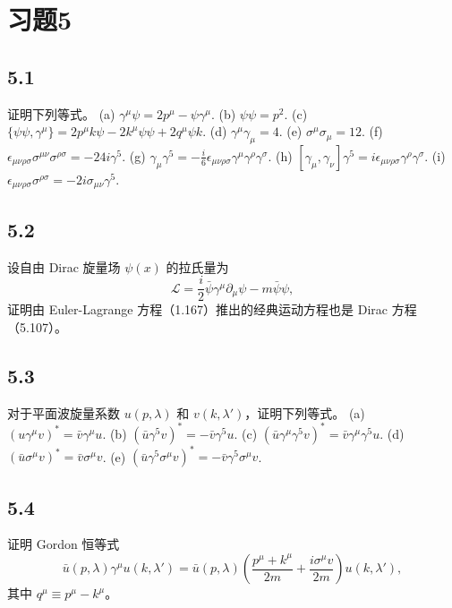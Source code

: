 \section{习题5}

\newpage
\subsection{5.1}
证明下列等式。
(a) $\gamma^\mu \psi = 2p^\mu - \psi \gamma^\mu$.
(b) $\psi \psi = p^2$.
(c) $\{\psi \psi, \gamma^\mu \} = 2p^\mu k \psi - 2k^\mu \psi \psi + 2q^\mu \psi k$.
(d) $\gamma^\mu \gamma_\mu = 4$.
(e) $\sigma^\mu \sigma_\mu = 12$.
(f) $\epsilon_{\mu \nu \rho \sigma} \sigma^{\mu \nu} \sigma^{\rho \sigma} = -24i \gamma^5$.
(g) $\gamma_\mu \gamma^5 = -\frac{i}{6} \epsilon_{\mu \nu \rho \sigma} \gamma^\mu \gamma^\rho \gamma^\sigma$.
(h) $[\gamma_\mu, \gamma_\nu] \gamma^5 = i \epsilon_{\mu \nu \rho \sigma} \gamma^\rho \gamma^\sigma$.
(i) $\epsilon_{\mu \nu \rho \sigma} \sigma^{\rho \sigma} = -2i \sigma_{\mu \nu} \gamma^5$.

\newpage
\subsection{5.2}
设自由 Dirac 旋量场 $\psi(x)$ 的拉氏量为
$$\mathcal{L} = \frac{i}{2} \bar{\psi} \gamma^\mu \partial_\mu \psi - m \bar{\psi} \psi, \tag{5.295}$$
证明由 Euler-Lagrange 方程（1.167）推出的经典运动方程也是 Dirac 方程（5.107）。

\newpage
\subsection{5.3}
对于平面波旋量系数 $u(p, \lambda)$ 和 $v(k, \lambda')$，证明下列等式。
(a) $(u \gamma^\mu v)^* = \bar{v} \gamma^\mu u$.
(b) $(\bar{u} \gamma^5 v)^* = -\bar{v} \gamma^5 u$.
(c) $(\bar{u} \gamma^\mu \gamma^5 v)^* = \bar{v} \gamma^\mu \gamma^5 u$.
(d) $(\bar{u} \sigma^\mu v)^* = \bar{v} \sigma^\mu v$.
(e) $(\bar{u} \gamma^5 \sigma^\mu v)^* = -\bar{v} \gamma^5 \sigma^\mu v$.

\newpage
\subsection{5.4}
证明 Gordon 恒等式
$$\bar{u}(p, \lambda) \gamma^\mu u(k, \lambda') = \bar{u}(p, \lambda) \left( \frac{p^\mu + k^\mu}{2m} + \frac{i\sigma^\mu v}{2m} \right) u(k, \lambda'),$$
其中 $q^\mu \equiv p^\mu - k^\mu$。

\newpage
